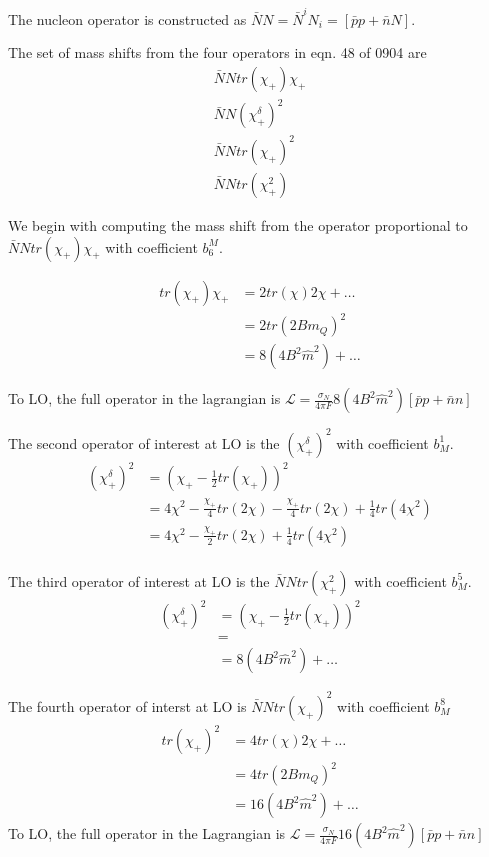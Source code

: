 \documentclass[12pt,tightenlines, raggedbottom, prd, notitlepage]{revtex4-1}
\begin{document}
The nucleon operator is constructed as $\bar{N}N = \bar{N}^iN_i = [\bar{p}p + \bar{n}N]$. 

The set of mass shifts from the four operators in eqn. 48 of 0904 are 
\begin{align*}
\bar{N}Ntr(\chi_+)\chi_+ \\
\bar{N}N(\chi^\delta_+)^2 \\
\bar{N}Ntr(\chi_+)^2  \\
\bar{N}Ntr(\chi^2_+) 
\end{align*}


We begin with computing the mass shift from the operator proportional to $\bar{N}Ntr(\chi_+)\chi_+$ with coefficient $b^M_6$. 

\begin{align*}
tr(\chi_+)\chi_+ &= 2tr(\chi)2\chi + \dots \\
&= 2tr(2Bm_Q)^2 \\
&= 8(4B^2\hat{m}^2) + \dots
\end{align*}

To LO, the full operator in the lagrangian is 
$\mathcal{L} = \frac{\sigma_N}{4\pi F}8(4B^2\hat{m}^2) [\bar{p}p + \bar{n}n] $


The second operator of interest at LO is the $(\chi^\delta_+)^2$ with coefficient $b^1_M$.
\begin{align*}
(\chi^\delta_+)^2 &= (\chi_+ - \frac{1}{2}tr(\chi_+))^2 \\
&= 4\chi^2 - \frac{\chi_+}{4}tr(2\chi) - \frac{\chi_+}{4}tr(2\chi) + \frac{1}{4}tr(4\chi^2) \\
&= 4\chi^2 - \frac{\chi_+}{2}tr(2\chi) + \frac{1}{4}tr(4\chi^2) \\
\end{align*}

The third operator of interest at LO is the $\bar{N}Ntr(\chi^2_+)$ with coefficient $b^5_M$.
\begin{align*}
(\chi^\delta_+)^2 &= (\chi_+ - \frac{1}{2}tr(\chi_+))^2 \\
&= 
  \\
&= 8(4B^2\hat{m}^2) + \dots
\end{align*}

The fourth operator of interst at LO is $\bar{N}Ntr(\chi_+)^2$ with coefficient $b^8_M$
\begin{align*}
tr(\chi_+)^2 &= 4tr(\chi)2\chi + \dots \\
&= 4tr(2Bm_Q)^2 \\
&= 16(4B^2\hat{m}^2) + \dots
\end{align*}
To LO, the full operator in the Lagrangian is 
$\mathcal{L} = \frac{\sigma_N}{4\pi F}16(4B^2\hat{m}^2) [\bar{p}p + \bar{n}n] $
\end{document}
